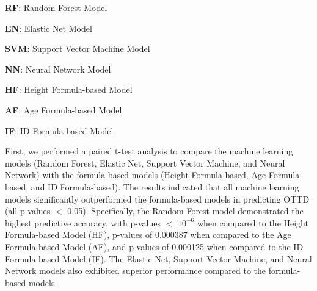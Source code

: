 \documentclass[11pt]{article}
\begin{document}
\begin{table}[h]
\caption{P-values of paired t-tests between Machine Learning models and Formula-based models for Optimal Tracheal Tube Depth}
\label{table:ComparisonModels}
\begin{threeparttable}
\renewcommand{\TPTminimum}{\linewidth}
\begin{tablenotes}
\footnotesize
\item \textbf{RF}: Random Forest Model
\item \textbf{EN}: Elastic Net Model
\item \textbf{SVM}: Support Vector Machine Model
\item \textbf{NN}: Neural Network Model
\item \textbf{HF}: Height Formula-based Model
\item \textbf{AF}: Age Formula-based Model
\item \textbf{IF}: ID Formula-based Model
\end{tablenotes}
\end{threeparttable}
\end{table}


First, we performed a paired t-test analysis to compare the machine learning models (Random Forest, Elastic Net, Support Vector Machine, and Neural Network) with the formula-based models (Height Formula-based, Age Formula-based, and ID Formula-based). The results indicated that all machine learning models significantly outperformed the formula-based models in predicting OTTD (all p-values $<$ 0.05). Specifically, the Random Forest model demonstrated the highest predictive accuracy, with p-values $<$ $10^{-6}$ when compared to the Height Formula-based Model (HF), p-values of 0.000387 when compared to the Age Formula-based Model (AF), and p-values of 0.000125 when compared to the ID Formula-based Model (IF). The Elastic Net, Support Vector Machine, and Neural Network models also exhibited superior performance compared to the formula-based models.
\end{document}
